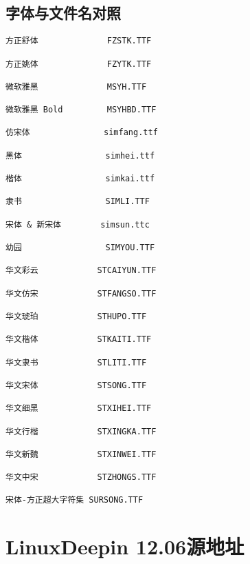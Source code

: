 \subsection{字体与文件名对照}
\begin{verbatim}
方正舒体              FZSTK.TTF

方正姚体              FZYTK.TTF

微软雅黑              MSYH.TTF

微软雅黑 Bold         MSYHBD.TTF

仿宋体               simfang.ttf

黑体                 simhei.ttf

楷体                 simkai.ttf

隶书                 SIMLI.TTF

宋体 & 新宋体        simsun.ttc

幼园                 SIMYOU.TTF

华文彩云            STCAIYUN.TTF

华文仿宋            STFANGSO.TTF

华文琥珀            STHUPO.TTF

华文楷体            STKAITI.TTF

华文隶书            STLITI.TTF

华文宋体            STSONG.TTF

华文细黑            STXIHEI.TTF

华文行楷            STXINGKA.TTF

华文新魏            STXINWEI.TTF

华文中宋            STZHONGS.TTF

宋体-方正超大字符集 SURSONG.TTF
\end{verbatim}
\section{LinuxDeepin 12.06源地址}

